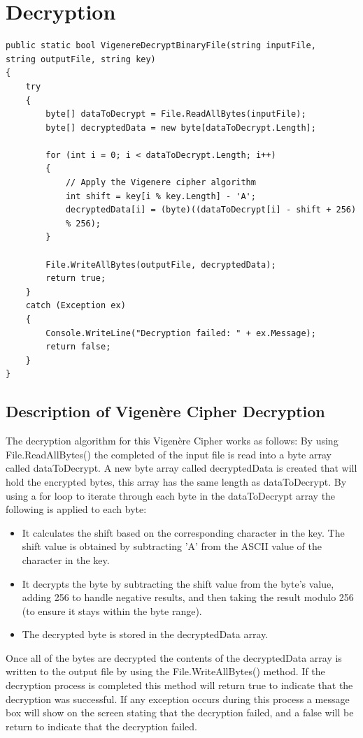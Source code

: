 \documentclass[a4paper,oneside,11pt]{book}
\begin{document}
\section{Decryption}

\begin{lstlisting}[language=Csh, caption={Code for Vigenère Cipher Decryption}]
public static bool VigenereDecryptBinaryFile(string inputFile, 
string outputFile, string key)
{
    try
    {
        byte[] dataToDecrypt = File.ReadAllBytes(inputFile);
        byte[] decryptedData = new byte[dataToDecrypt.Length];

        for (int i = 0; i < dataToDecrypt.Length; i++)
        {
            // Apply the Vigenere cipher algorithm
            int shift = key[i % key.Length] - 'A';
            decryptedData[i] = (byte)((dataToDecrypt[i] - shift + 256)
            % 256);
        }

        File.WriteAllBytes(outputFile, decryptedData);
        return true;
    }
    catch (Exception ex)
    {
        Console.WriteLine("Decryption failed: " + ex.Message);
        return false;
    }
}
\end{lstlisting}

\subsection{Description of Vigenère Cipher Decryption}

The decryption algorithm for this Vigenère Cipher works as follows:
By using File.ReadAllBytes() the completed of the input file is read into a byte array called dataToDecrypt. A new byte array called decryptedData is created that will hold the encrypted bytes, this array has the same length as dataToDecrypt. By using a for loop to iterate through each byte in the dataToDecrypt array the following is applied to each byte:
\begin{itemize}
    \item 
        It calculates the shift based on the corresponding character in the key. The shift value is obtained by subtracting 'A' from the ASCII value of the character in the key.
    \item 
        It decrypts the byte by subtracting the shift value from the byte's value, adding 256 to handle negative results, and then taking the result modulo 256 (to ensure it stays within the byte range).
    \item 
        The decrypted byte is stored in the decryptedData array.
\end{itemize}
Once all of the bytes are decrypted the contents of the decryptedData array is written to the output file by using the File.WriteAllBytes() method. If the decryption process is completed this method will return true to indicate that the decryption was successful. If any exception occurs during this process a message box will show on the screen stating that the decryption failed, and a false will be return to indicate that the decryption failed.
\end{document}
